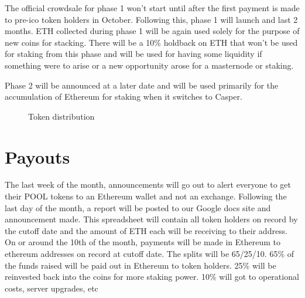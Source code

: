 The official crowdsale for phase 1 won’t start until after the first payment is made to pre-ico token holders in October. Following this, phase 1 will launch and last 2 months. ETH collected during phase 1 will be again used solely for the purpose of new coins for stacking. There will be a 10\% holdback on ETH that won’t be used for staking from this phase and will be used for having some liquidity if something were to arise or a new opportunity arose for a masternode or staking. 

Phase 2 will be announced at a later date and will be used primarily for the accumulation of Ethereum for staking when it switches to Casper.

\begin{figure}[h]
\centering
\caption{Token distribution}
\end{figure}

\newpage

\section{Payouts}
The last week of the month, announcements will go out to alert everyone to get their POOL tokens to an Ethereum wallet and not an exchange. Following the last day of the month, a report will be posted to our Google docs site and announcement made. This spreadsheet will contain all token holders on record by the cutoff date and the amount of ETH each will be receiving to their address. On or around the 10th of the month, payments will be made in Ethereum to ethereum addresses on record at cutoff date. The splits will be 65/25/10. 65\% of the funds raised will be paid out in Ethereum to token holders. 25\% will be reinvested back into the coins for more staking power. 10\% will got to operational costs, server upgrades, etc

